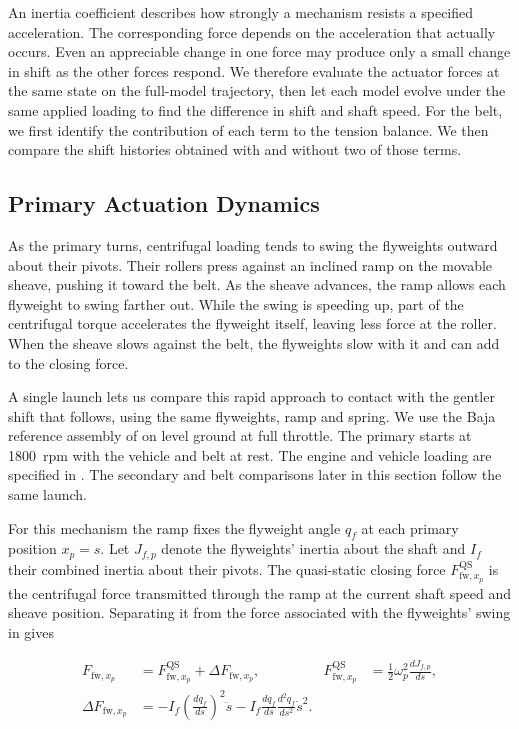 \documentclass[11pt]{report}
\numberwithin{equation}{section}
\begin{document}
An inertia coefficient describes how strongly a mechanism resists a
specified acceleration. The corresponding force depends on the acceleration
that actually occurs. Even an appreciable change in one force may produce
only a small change in shift as the other forces respond. We therefore
evaluate the actuator forces at the same state on the full-model trajectory,
then let each model evolve under the same applied loading to find the
difference in shift and shaft speed. For the belt, we first identify the
contribution of each term to the tension balance. We then compare the shift
histories obtained with and without two of those terms.

\subsection{Primary Actuation Dynamics}
\label{sec:results_primary_actuator_dynamics}

As the primary turns, centrifugal loading tends to swing the flyweights
outward about their pivots. Their rollers press against an inclined ramp
on the movable sheave, pushing it toward the belt. As the sheave advances,
the ramp allows each flyweight to swing farther out. While the swing is
speeding up, part of the centrifugal torque accelerates the flyweight
itself, leaving less force at the roller. When the sheave slows against
the belt, the flyweights slow with it and can add to the closing force.

A single launch lets us compare this rapid approach to contact with the
gentler shift that follows, using the same flyweights, ramp and spring.
We use the Baja reference assembly of 
on level ground at full throttle. The primary starts at \SI{1800}{rpm}
with the vehicle and belt at rest. The engine and vehicle loading are
specified in . The secondary and belt
comparisons later in this section follow the same launch.

For this mechanism the ramp fixes the flyweight angle \(q_f\) at each
primary position \(x_p=s\). Let \(J_{f,p}\) denote the flyweights'
inertia about the shaft and \(I_f\) their combined inertia about their
pivots. The quasi-static closing force \(F_{\mathrm{fw},x_p}^{\mathrm{QS}}\)
is the centrifugal force transmitted through the ramp at the current
shaft speed and sheave position. Separating it from the force associated with the
flyweights' swing in  gives

\begin{equation}
\begin{aligned}
 F_{\mathrm{fw},x_p}
 &=F_{\mathrm{fw},x_p}^{\mathrm{QS}}+\Delta F_{\mathrm{fw},x_p},
 &F_{\mathrm{fw},x_p}^{\mathrm{QS}}
 &=\frac12\omega_p^2\frac{dJ_{f,p}}{ds},\\
 \Delta F_{\mathrm{fw},x_p}
 &=-I_f\left(\frac{dq_f}{ds}\right)^2\ddot s
   -I_f\frac{dq_f}{ds}\frac{d^2q_f}{ds^2}\dot s^2.
\end{aligned}
\label{eq:results_primary_dynamic_decomposition}
\end{equation}
\end{document}
